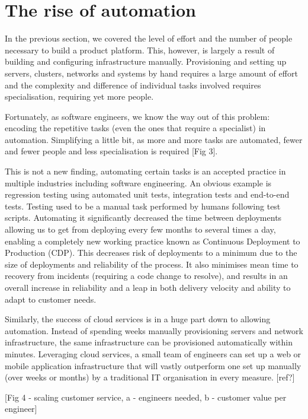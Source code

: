 \documentclass[reprint,amsmath,amssymb,aps]{revtex4-1}
\begin{document}
\section{\label{sec:automation}The rise of automation}

In the previous section, we covered the level of effort and the number of people necessary to build a product platform. This, however, is largely a result of building and configuring infrastructure manually. Provisioning and setting up servers, clusters, networks and systems by hand requires a large amount of effort and the complexity and difference of individual tasks involved requires specialisation, requiring yet more people.
 
Fortunately, as software engineers, we know the way out of this problem: encoding the repetitive tasks (even the ones that require a specialist) in automation. Simplifying a little bit, as more and more tasks are automated, fewer and fewer people and less specialisation is required [Fig 3].

This is not a new finding, automating certain tasks is an accepted practice in multiple industries including software engineering. An obvious example is regression testing using automated unit tests, integration tests and end-to-end tests. Testing used to be a manual task performed by humans following test scripts. Automating it significantly decreased the time between deployments allowing us to get from deploying every few months to several times a day, enabling a completely new working practice known as Continuous Deployment to Production (CDP). This decreases risk of deployments to a minimum due to the size of deployments and reliability of the process. It also minimises mean time to recovery from incidents (requiring a code change to resolve), and results in an overall increase in reliability and a leap in both delivery velocity and ability to adapt to customer needs.

Similarly, the success of cloud services is in a huge part down to allowing automation. Instead of spending weeks manually provisioning servers and network infrastructure, the same infrastructure can be provisioned automatically within minutes. Leveraging cloud services, a small team of engineers can set up a web or mobile application infrastructure that will vastly outperform one set up manually (over weeks or months) by a traditional IT organisation in every measure. [ref?]

[Fig 4 - scaling customer service, a - engineers needed, b - customer value per engineer]
\end{document}
